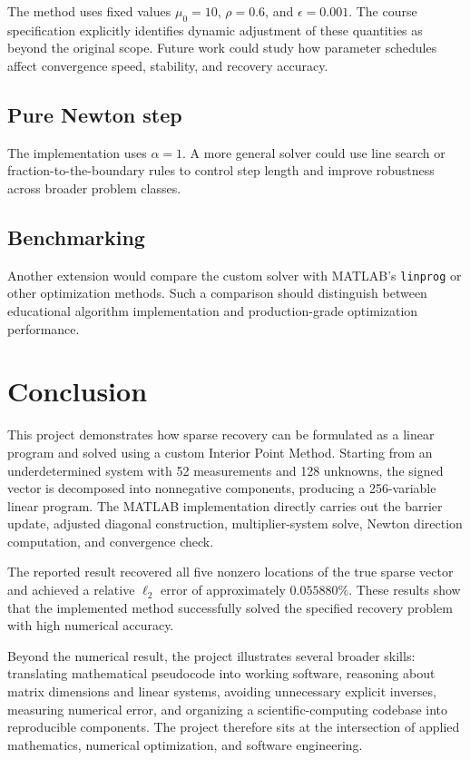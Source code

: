 \documentclass[11pt]{article}
\begin{document}
The method uses fixed values $\mu_0=10$, $\rho=0.6$, and $\epsilon=0.001$. The course specification explicitly identifies dynamic adjustment of these quantities as beyond the original scope. Future work could study how parameter schedules affect convergence speed, stability, and recovery accuracy.

\subsection{Pure Newton step}

The implementation uses $\alpha=1$. A more general solver could use line search or fraction-to-the-boundary rules to control step length and improve robustness across broader problem classes.

\subsection{Benchmarking}

Another extension would compare the custom solver with MATLAB's \texttt{linprog} or other optimization methods. Such a comparison should distinguish between educational algorithm implementation and production-grade optimization performance.

\section{Conclusion}
This project demonstrates how sparse recovery can be formulated as a linear program and solved using a custom Interior Point Method. Starting from an underdetermined system with 52 measurements and 128 unknowns, the signed vector is decomposed into nonnegative components, producing a 256-variable linear program. The MATLAB implementation directly carries out the barrier update, adjusted diagonal construction, multiplier-system solve, Newton direction computation, and convergence check.

The reported result recovered all five nonzero locations of the true sparse vector and achieved a relative $\ell_2$ error of approximately $0.055880\%$. These results show that the implemented method successfully solved the specified recovery problem with high numerical accuracy.

Beyond the numerical result, the project illustrates several broader skills: translating mathematical pseudocode into working software, reasoning about matrix dimensions and linear systems, avoiding unnecessary explicit inverses, measuring numerical error, and organizing a scientific-computing codebase into reproducible components. The project therefore sits at the intersection of applied mathematics, numerical optimization, and software engineering.
\end{document}
